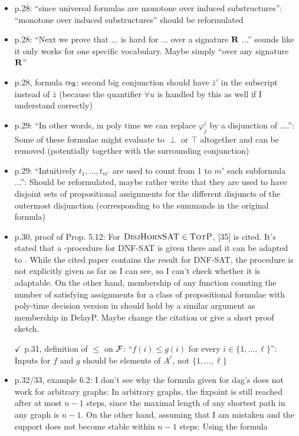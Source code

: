 \documentclass[a4paper]{article}
\begin{document}
\begin{itemize}
	\item p.28: ``since universal formulas are monotone over induced substructures'': ``monotone over
	induced substructures'' should be reformulated
	\item p.28: ``Next we prove that ... is hard for ... over a signature $\mathbf{R}$ ...'' sounds like it only works
	for one specific vocabulary. Maybe simply ``over any signature $\mathbf{R}$''
	\item p.28, formula $\alpha_{\mathfrak{A}}$: second big conjunction should have $\bar{z}'$ in the subscript instead of $\bar{z}$ (because
	the quantifier $\forall u$ is handled by this as well if I understand correctly)
	\item p.29: ``In other words, in poly time we can replace $\varphi_j^i$ by a disjunction of ....'': Some of these
	formulae might evaluate to $\perp$ or $\top$ altogether and can be removed (potentially together with
	the surrounding conjunction)
	\item p.29: ``Intuitively $t_1,\ldots,t_{m'}$ are used to count from 1 to $m'$ each subformula ...'': Should be
	reformulated, maybe rather write that they are used to have disjoint sets of propositional
	assignments for the different disjuncts of the outermost disjunction (corresponding to the
	summands in the original formula)
	\item p.30, proof of Prop. 5.12: For $\textsc{DisjHornSAT} \in \text{\sc TotP}$, [35] is cited. It’s stated that a \totp-procedure
	for DNF-SAT is given there and it can be adapted to \dhsat. While the
	cited paper contains the result for DNF-SAT, the procedure is not explicitly given as far as
	I can see, so I can't check whether it is adaptable. On the other hand, membership of any
	function counting the number of satisfying assignments for a class of propositional formulae
	with poly-time decision version in \totp should hold by a similar argument as membership in
	DelayP. Maybe change the citation or give a short proof sketch.
	\item[$\checkmark$] p.31, definition of $\leq$ on $\mathcal{F}$: ``$f(i) \leq g(i)$ for every $i \in \{1,\ldots,\ell\}$'': Inputs for $f$ and $g$ should be
	elements of $A^{\ell}$, not $\{1,\ldots,\ell\}$
	\item p.32/33, example 6.2: I don't see why the formula given for dag's does not work for arbitrary
	graphs: In arbitrary graphs, the fixpoint is still reached after at most $n-1$ steps, since the
	maximal length of any shortest path in any graph is $n-1$. On the other hand, assuming that
	I am mistaken and the support does not become stable within $n-1$ steps: Using the formula

\end{itemize}
\end{document}
